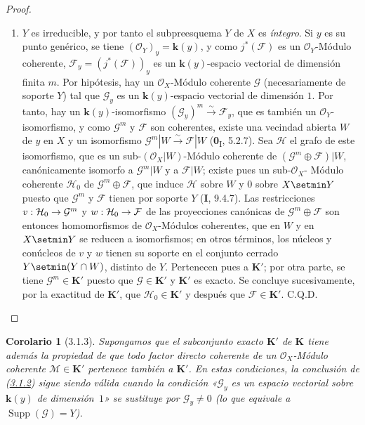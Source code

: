 \documentclass[10pt,oneside,openany]{book}
\theoremstyle{egaenv}\newtheorem*{env}{---}
\theoremstyle{egastatement}
\newtheorem*{corollary}{Corolario}
\theoremstyle{egadescription}
\renewcommand{\to}{\mathchoice{\longrightarrow}{\rightarrow}{\rightarrow}{\rightarrow}}
\begin{document}
\begin{proof}
\begin{enumerate}
\item[\textit{b)}] $Y$ es irreducible, y por tanto el subpreesquema $Y$ de $X$ es
\emph{íntegro}. Si $y$ es su punto genérico, se tiene
$(\mathcal O_Y)_y=\boldsymbol{k}(y)$, y como $j^*(\mathcal F)$ es un
$\mathcal O_Y$-Módulo coherente, $\mathcal F_y=(j^*(\mathcal F))_y$ es un
$\boldsymbol{k}(y)$-espacio vectorial de dimensión finita $m$. Por hipótesis, hay un
$\mathcal O_X$-Módulo coherente $\mathcal G$ (necesariamente de soporte $Y$)
tal que $\mathcal G_y$ es un $\boldsymbol{k}(y)$-espacio vectorial de dimensión $1$. Por
tanto, hay un $\boldsymbol{k}(y)$-isomorfismo
$(\mathcal G_y)^m\xrightarrow{\sim}\mathcal F_y$, que es también un
$\mathcal O_Y$-isomorfismo, y como $\mathcal G^m$ y $\mathcal F$ son
coherentes, existe una vecindad abierta $W$ de $y$ en $X$ y un
isomorfismo $\mathcal G^m|W\xrightarrow{\sim}\mathcal F|W$
(\textbf{0}\textsubscript{I}, 5.2.7). Sea $\mathcal H$ el grafo de este isomorfismo,
que es un sub-$(\mathcal O_X|W)$-Módulo coherente de
$(\mathcal G^m\oplus\mathcal F)|W$, canónicamente isomorfo a
$\mathcal G^m|W$ y a $\mathcal F|W$; existe pues un sub-$\mathcal O_X$-%
Módulo coherente $\mathcal H_0$ de $\mathcal G^m\oplus\mathcal F$, que induce
$\mathcal H$ sobre $W$ y $0$ sobre $X\setmin Y$ puesto que $\mathcal G^m$ y
$\mathcal F$ tienen por soporte $Y$ (\textbf{I}, 9.4.7). Las restricciones
$v:\mathcal H_0\to\mathcal G^m$ y $w:\mathcal H_0\to\mathcal F$ de las
proyecciones canónicas de $\mathcal G^m\oplus\mathcal F$ son entonces
homomorfismos de $\mathcal O_X$-Módulos coherentes, que en $W$ y en
$X\setmin Y$ se reducen a isomorfismos; en otros términos, los núcleos y
conúcleos de $v$ y $w$ tienen su soporte en el conjunto cerrado
$Y\setmin(Y\cap W)$, distinto de $Y$. Pertenecen pues a $\boldsymbol{K}'$; por otra
parte, se tiene $\mathcal G^m\in\boldsymbol{K}'$ puesto que $\mathcal G\in\boldsymbol{K}'$ y $\boldsymbol{K}'$ es
exacto. Se concluye sucesivamente, por la exactitud de $\boldsymbol{K}'$, que
$\mathcal H_0\in\boldsymbol{K}'$ y después que $\mathcal F\in\boldsymbol{K}'$. C.Q.D.
\end{enumerate}
\end{proof}

\begin{corollary}[3.1.3]
\label{III.3.1.3-fr}
Supongamos que el subconjunto exacto $\boldsymbol{K}'$ de $\boldsymbol{K}$ tiene además la propiedad
de que todo factor directo coherente de un $\mathcal O_X$-Módulo coherente
$\mathcal M\in\boldsymbol{K}'$ pertenece también a $\boldsymbol{K}'$. En estas condiciones, la
conclusión de (\hyperref[III.3.1.2-fr]{3.1.2}) sigue siendo válida cuando la
condición «$\mathcal G_y$ es un espacio vectorial sobre $\boldsymbol{k}(y)$ de dimensión~$1$» se sustituye por $\mathcal G_y\neq0$ (lo que equivale a $\operatorname{Supp}(\mathcal G)=Y$).
\end{corollary}
\end{document}
